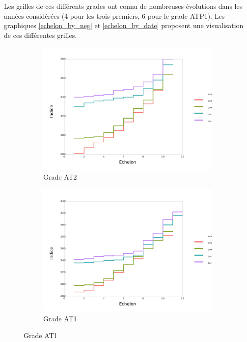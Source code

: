 \documentclass[11pt,a4paper]{article}
\begin{document}
Les grilles de ces différents grades ont connu de nombreuses évolutions dans les années considérées (4 pour les trois premiers, 6 pour le grade ATP1). Les graphiques \ref{echelon_by_neg} et \ref{echelon_by_date} proposent une visualisation de ces différentes grilles. 



\begin{figure}[ht] 
  \caption{Evolution des grilles: grade par grade}
  \label{echelon_by_neg} 
  \begin{subfigure}[b]{0.55\linewidth}
      \caption{Grade AT2} 
    \label{echelon_by_neg_0} 
    \centering
    \includegraphics[width=1\linewidth]{0_grille_by_neg.pdf} 
    \vspace{4ex}
  \end{subfigure}%
  \begin{subfigure}[b]{0.55\linewidth}
        \caption{Grade AT1} 
    \label{echelon_by_neg_1} 
    \centering
    \includegraphics[width=1\linewidth]{1_grille_by_neg.pdf} 

\end{subfigure}
\end{figure}
\end{document}
